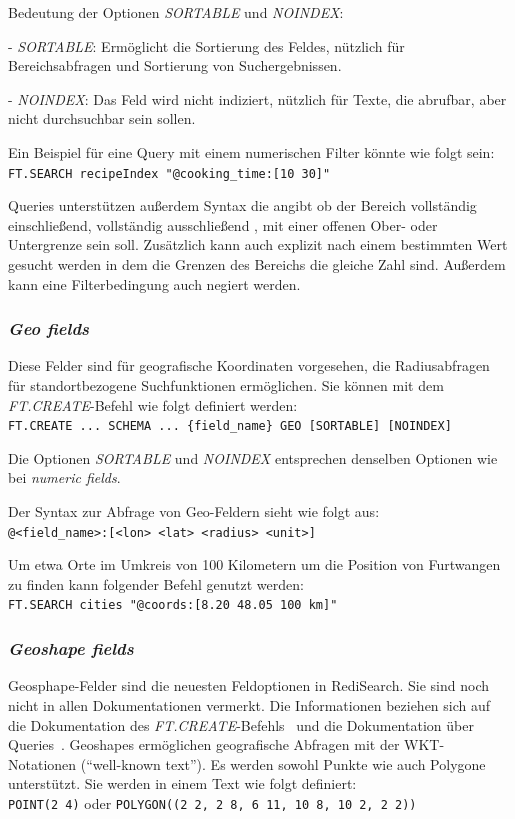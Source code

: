 Bedeutung der Optionen \emph{SORTABLE} und \emph{NOINDEX}:

- \emph{SORTABLE}: Ermöglicht die Sortierung des Feldes, nützlich für Bereichsabfragen und Sortierung von Suchergebnissen.

- \emph{NOINDEX}: Das Feld wird nicht indiziert, nützlich für Texte, die abrufbar, aber nicht durchsuchbar sein sollen.

Ein Beispiel für eine Query mit einem numerischen Filter könnte wie folgt sein:\\
\texttt{FT.SEARCH recipeIndex "@cooking\_time:[10 30]"}

Queries unterstützen außerdem Syntax die angibt ob der Bereich vollständig einschließend, vollständig ausschließend , mit einer offenen Ober- oder Untergrenze sein soll. Zusätzlich kann auch explizit nach einem bestimmten Wert gesucht werden in dem die Grenzen des Bereichs die gleiche Zahl sind. Außerdem kann eine Filterbedingung auch negiert werden.

\subsubsection{\emph{Geo fields}} Diese Felder sind für geografische Koordinaten vorgesehen, die Radiusabfragen für standortbezogene Suchfunktionen ermöglichen.
Sie können mit dem \emph{FT.CREATE}-Befehl wie folgt definiert werden:\\
\texttt{FT.CREATE ... SCHEMA ... \{field\_name\} GEO [SORTABLE] [NOINDEX]}

Die Optionen \emph{SORTABLE} und \emph{NOINDEX} entsprechen denselben Optionen wie bei \emph{numeric fields}. 

Der Syntax zur Abfrage von Geo-Feldern sieht wie folgt aus:\\
\texttt{@<field\_name>:[<lon> <lat> <radius> <unit>]}

Um etwa Orte im Umkreis von 100 Kilometern um die Position von Furtwangen zu finden kann folgender Befehl genutzt werden:\\
\texttt{FT.SEARCH cities "@coords:[8.20 48.05 100 km]"}

\subsubsection{\emph{Geoshape fields}}
Geosphape-Felder sind die neuesten Feldoptionen in RediSearch. Sie sind noch nicht in allen Dokumentationen vermerkt. Die Informationen beziehen sich auf die Dokumentation des \emph{FT.CREATE}-Befehls~\cite{redis_ltd_ftcreate_nodate} und die Dokumentation über Queries~\cite{redis_ltd_query_nodate}. 
Geoshapes ermöglichen geografische Abfragen mit der WKT-Notationen (\enquote{well-known text}).
Es werden sowohl Punkte wie auch Polygone unterstützt. Sie werden in einem Text wie folgt definiert:\\
\texttt{POINT(2 4)} oder \texttt{POLYGON((2 2, 2 8, 6 11, 10 8, 10 2, 2 2))}

